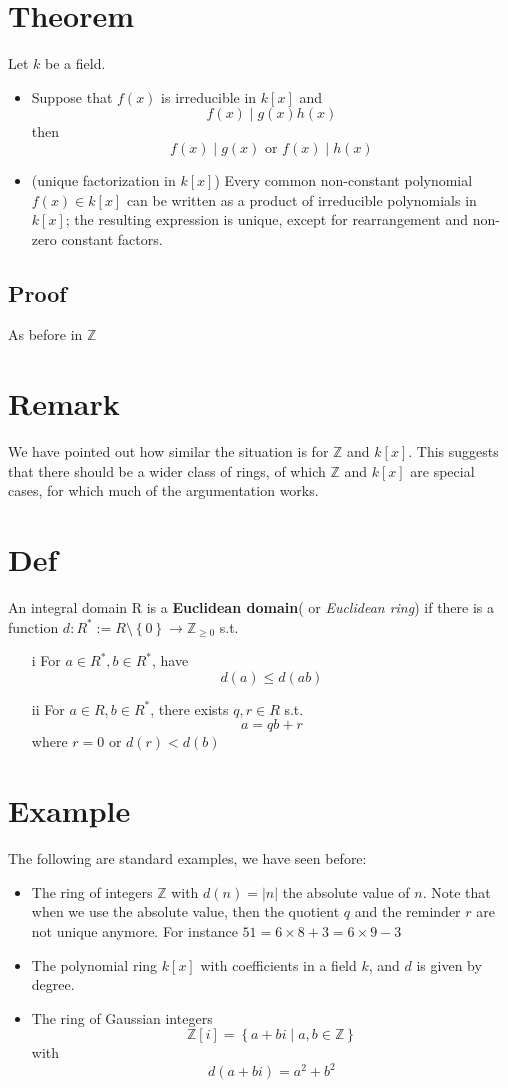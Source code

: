 \documentclass{book}
\newcommand{\abs}[1]{\left\lvert #1 \right\rvert}
\newcommand{\set}[1]{\left\{#1\right\}}
\begin{document}
\section{Theorem}
Let $k$ be a field. 
\begin{itemize}
	\item Suppose that $f(x)$ is irreducible in $k[x]$ and $$f(x)\mid g(x)h(x)$$ then$$f(x)\mid g(x)\text{ or }f(x)\mid h(x)$$
	\item (unique factorization in $k[x]$) Every common non-constant polynomial $f(x)\in k[x]$ can be written as a product of irreducible polynomials in $k[x]$; the resulting expression is unique, except for rearrangement and non-zero constant factors.
\end{itemize}
\subsection*{Proof}
As before in $\mathbb Z$
\section*{Remark}
We have pointed out how similar the situation is for $\mathbb Z$ and $k[x]$. This suggests that there should be a wider class of rings, of which $\mathbb Z$ and $k[x]$ are special cases, for which much of the argumentation works.
\section{Def}\label{Def:Euclidean domain}
An integral domain R is a \textbf{Euclidean domain}( or \textit{Euclidean ring}) if there is a function $d:R^*:=R\setminus\set 0\to\mathbb Z_{\geq 0}$ s.t.\begin{itemize}
	\item[i] For $a\in R^*,b\in R^*$, have $$d(a)\leq d(ab)$$
	\item[ii] For $a\in R,b\in R^*$, there exists $q,r\in R$ s.t.$$a=qb+r$$ where $r=0$ or $d(r)<d(b)$
\end{itemize}
\section{Example}
The following are standard examples, we have seen before:
\begin{itemize}
	\item The ring of integers $\mathbb Z$ with $d(n)=\abs n$ the absolute value of $n$. Note that when we use the absolute value, then the quotient $q$ and the reminder $r$ are not unique anymore. For instance $51=6\times 8+3=6\times 9-3$
	\item The polynomial ring $k[x]$ with coefficients in a field $k$, and $d$ is given by degree.
	\item The ring of Gaussian integers $$\mathbb Z[i]=\set{a+bi\mid a,b\in \mathbb Z}$$ with $$d(a+bi)=a^2+b^2$$
\end{itemize}
\end{document}
